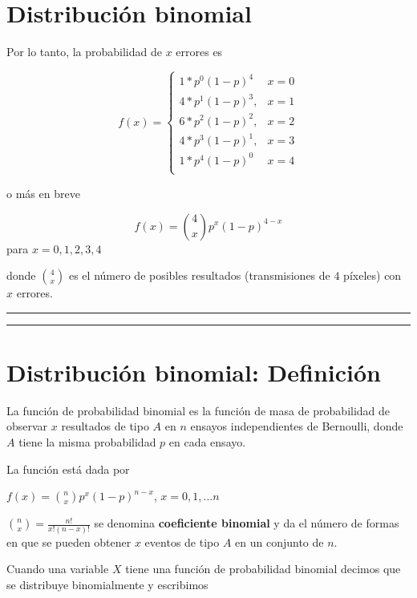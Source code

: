 \documentclass[
]{book}
\begin{document}
\hypertarget{distribuciuxf3n-binomial-2}{%
\section{Distribución binomial}\label{distribuciuxf3n-binomial-2}}

Por lo tanto, la probabilidad de \(x\) errores es

\[
    f(x)=
\begin{cases}
    1*p^0(1-p)^4 & x=0 \\
    4*p^1(1-p)^3,& x=1 \\
    6*p^2(1-p)^2,& x=2 \\
    4*p^3(1-p)^1,& x=3 \\
    1*p^4(1-p)^0 & x=4 \\
\end{cases}
\]

o más en breve

\[f(x)=\binom 4 x p^x(1-p)^{4-x}\]
para \(x=0,1,2,3,4\)

donde \(\binom 4 x\) es el número de posibles resultados (transmisiones de \(4\) píxeles) con \(x\) errores.

\begin{center}\rule{0.5\linewidth}{0.5pt}\end{center}

\begin{center}\rule{0.5\linewidth}{0.5pt}\end{center}

\hypertarget{distribuciuxf3n-binomial-definiciuxf3n}{%
\section{Distribución binomial: Definición}\label{distribuciuxf3n-binomial-definiciuxf3n}}

La función de probabilidad binomial es la función de masa de probabilidad de observar \(x\) resultados de tipo \(A\) en \(n\) ensayos independientes de Bernoulli, donde \(A\) tiene la misma probabilidad \(p\) en cada ensayo.

La función está dada por

\(f(x)=\binom n x p^x(1-p)^{n-x}\), \(x=0,1,...n\)

\(\binom n x= \frac{n!}{x!(n-x)!}\) se denomina \textbf{coeficiente binomial} y da el número de formas en que se pueden obtener \(x\) eventos de tipo \(A\) en un conjunto de \(n\).

Cuando una variable \(X\) tiene una función de probabilidad binomial decimos que se distribuye binomialmente y escribimos
\end{document}
